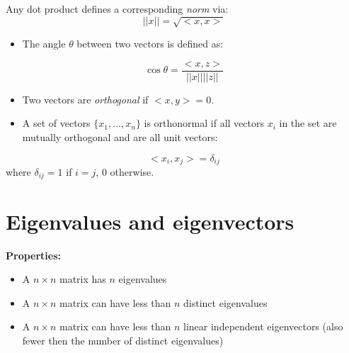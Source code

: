 Any dot product defines a corresponding \textit{norm} via:
\begin{equation*}
	||x|| = \sqrt{<x,x>}
\end{equation*}

\begin{itemize}
	\item The angle $\theta$ between two vectors is defined as:
\end{itemize}
\begin{equation}
	\cos{\theta}= \frac{<x,z>}{||x||||z||}
\end{equation}

\begin{itemize}
	\item Two vectors are \textit{orthogonal} if $<x,y>=0$.

	\item A set of vectors $\{x_{1},...,x_{n}\}$ is orthonormal if all vectors $x_{i}$
		in the set are mutually orthogonal and are all unit vectors:
\end{itemize}
\begin{equation*}
	<x_{i}, x_{j}> = \delta_{ij}
\end{equation*}
\hspace{7mm} where $\delta_{ij}=1$ if $i=j$, $0$ otherwise.

\section{Eigenvalues and eigenvectors}
\label{sec:eigenvalues_eigenvectors}


\textbf{Properties:}
\begin{itemize}
	\item A $n \times n$ matrix has $n$ eigenvalues

	\item A $n \times n$ matrix can have less than $n$ distinct eigenvalues

	\item A $n \times n$ matrix can have less than $n$ linear independent eigenvectors
		(also fewer then the number of distinct eigenvalues)
\end{itemize}

